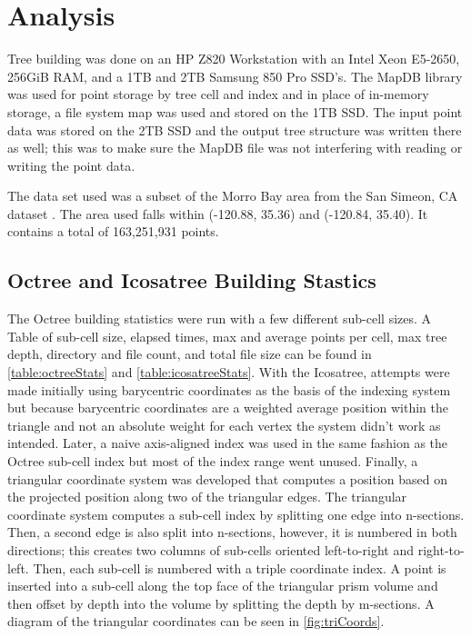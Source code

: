 \chapter{Analysis}

Tree building was done on an HP Z820 Workstation with an Intel Xeon E5-2650,
256GiB RAM, and a 1TB and 2TB Samsung 850 Pro SSD’s. The MapDB library was used
for point storage by tree cell and index and in place of in-memory storage, a
file system map was used and stored on the 1TB SSD. The input point data was
stored on the 2TB SSD and the output tree structure was written there as well;
this was to make sure the MapDB file was not interfering with reading or writing
the point data.

The data set used was a subset of the Morro Bay area from the San Simeon, CA
dataset \cite{15_opentopo_morrobay}. The area used falls within (-120.88, 35.36) and (-120.84, 35.40).
It contains a total of 163,251,931 points.

\section{Octree and Icosatree Building Stastics}

The Octree building statistics were run with a few different sub-cell sizes. A
Table of sub-cell size, elapsed times, max and average points per cell, max tree
depth, directory and file count, and total file size can be found in \ref{table:octreeStats} and
\ref{table:icosatreeStats}. With the Icosatree, attempts were made initially using barycentric
coordinates as the basis of the indexing system but because barycentric
coordinates are a weighted average position within the triangle and not an
absolute weight for each vertex the system didn’t work as intended. Later, a
naive axis-aligned index was used in the same fashion as the Octree sub-cell
index but most of the index range went unused. Finally, a triangular coordinate
system was developed that computes a position based on the projected position
along two of the triangular edges. The triangular coordinate system computes a
sub-cell index by splitting one edge into n-sections. Then, a second edge is
also split into n-sections, however, it is numbered in both directions; this
creates two columns of sub-cells oriented left-to-right and right-to-left. Then,
each sub-cell is numbered with a triple coordinate index. A point is inserted
into a sub-cell along the top face of the triangular prism volume and then
offset by depth into the volume by splitting the depth by m-sections. A diagram
of the triangular coordinates can be seen in \ref{fig:triCoords}.

